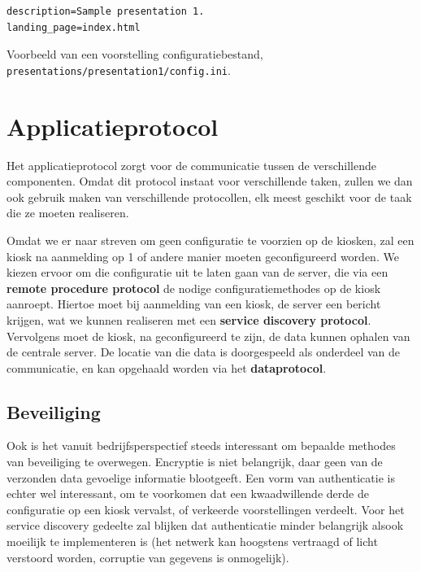 \begin{code}
\begin{verbatim}
description=Sample presentation 1.
landing_page=index.html
\end{verbatim}
\caption{Voorbeeld van een voorstelling configuratiebestand, \texttt{presentations/presentation1/config.ini}.}
\end{code}

\section{Applicatieprotocol}
\label{ontwerp:applicatie:applicatieprotocol}

Het applicatieprotocol zorgt voor de communicatie tussen de verschillende componenten. Omdat dit protocol instaat voor verschillende taken, zullen we dan ook gebruik maken van verschillende protocollen, elk meest geschikt voor de taak die ze moeten realiseren.

Omdat we er naar streven om geen configuratie te voorzien op de kiosken, zal een kiosk na aanmelding op 1 of andere manier moeten geconfigureerd worden. We kiezen ervoor om die configuratie uit te laten gaan van de server, die via een \textbf{remote procedure protocol} de nodige configuratiemethodes op de kiosk aanroept. Hiertoe moet bij aanmelding van een kiosk, de server een bericht krijgen, wat we kunnen realiseren met een \textbf{service discovery protocol}. Vervolgens moet de kiosk, na geconfigureerd te zijn, de data kunnen ophalen van de centrale server. De locatie van die data is doorgespeeld als onderdeel van de communicatie, en kan opgehaald worden via het \textbf{dataprotocol}.

\subsection{Beveiliging}

Ook is het vanuit bedrijfsperspectief steeds interessant om bepaalde methodes van beveiliging te overwegen. Encryptie is niet belangrijk, daar geen van de verzonden data gevoelige informatie blootgeeft. Een vorm van authenticatie is echter wel interessant, om te voorkomen dat een kwaadwillende derde de configuratie op een kiosk vervalst, of verkeerde voorstellingen verdeelt. Voor het service discovery gedeelte zal blijken dat authenticatie minder belangrijk alsook moeilijk te implementeren is (het netwerk kan hoogstens vertraagd of licht verstoord worden, corruptie van gegevens is onmogelijk).

